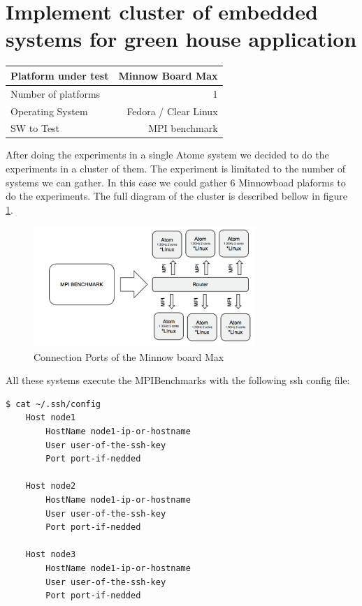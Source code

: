 \section{Implement cluster of embedded systems for green house application}


    \begin{center}
    \begin{tabular}{ | l | r |}
        \hline
        Platform under test & Minnow Board  Max \\ \hline
        Number of platforms  & 1  \\ \hline
        Operating System & Fedora / Clear Linux  \\ \hline
        SW to Test & MPI benchmark \\ \hline
    \end{tabular}
     \label{Sanity Sumary}
    \end{center}

After doing the experiments in a single Atome system we decided to do the
experiments in a cluster of them. The experiment is limitated to the number of
systems we can gather. In this case we could gather 6 Minnowboad
\cite{minnowboard} plaforms to do the experiments. The full diagram of the
cluster is described bellow in figure \ref{fig:5.20}.

\begin{figure}[H]
\centering
\includegraphics[width=0.75\textwidth]{images/cluster_minnows.png}
\caption{Connection Ports of the Minnow board Max}
\label{fig:5.20}
\end{figure}

All these systems execute the MPIBenchmarks with the following ssh config file:


\begin{lstlisting}[frame=single,language=bash]
  $ cat ~/.ssh/config
    Host node1
        HostName node1-ip-or-hostname
        User user-of-the-ssh-key
        Port port-if-nedded

    Host node2
        HostName node1-ip-or-hostname
        User user-of-the-ssh-key
        Port port-if-nedded

    Host node3
        HostName node1-ip-or-hostname
        User user-of-the-ssh-key
        Port port-if-nedded

\end{lstlisting}

